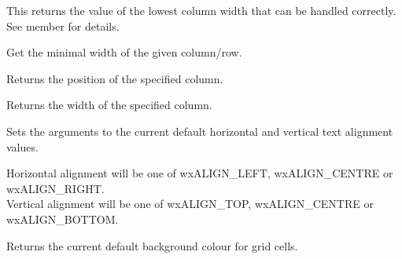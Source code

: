 This returns the value of the lowest column width that can be handled correctly. See
member  for details.



\label{wxgridgetcolminimalwidth}


Get the minimal width of the given column/row.



\label{wxgridgetcolpos}


Returns the position of the specified column.



\label{wxgridgetcolright}




\label{wxgridgetcolsize}


Returns the width of the specified column.



\label{wxgridgetdefaultcellalignment}


Sets the arguments to the current default horizontal and vertical text alignment
values.

Horizontal alignment will be one of wxALIGN\_LEFT, wxALIGN\_CENTRE or wxALIGN\_RIGHT. \\
Vertical alignment will be one of wxALIGN\_TOP, wxALIGN\_CENTRE or wxALIGN\_BOTTOM.



\label{wxgridgetdefaultcellbackgroundcolour}


Returns the current default background colour for grid cells.



\label{wxgridgetdefaultcellfont}

